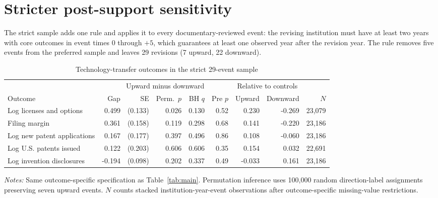 \section{Stricter post-support sensitivity}\label{app:strict}

The strict sample adds one rule and applies it to every documentary-reviewed event: the revising institution must have at least two years with core outcomes in event times 0 through $+5$, which guarantees at least one observed year after the revision year. The rule removes five events from the preferred sample and leaves 29 revisions (7 upward, 22 downward).

\begin{table}[htbp]\centering
\caption{Technology-transfer outcomes in the strict 29-event sample}\label{tab:strict}
\begin{threeparttable}\footnotesize\setlength{\tabcolsep}{4pt}
\begin{tabular}{lrrrrrrrr}\toprule
 & \multicolumn{5}{c}{Upward minus downward} & \multicolumn{2}{c}{Relative to controls} & \\\cmidrule(lr){2-6}\cmidrule(lr){7-8}
Outcome & Gap & SE & Perm.\ $p$ & BH $q$ & Pre $p$ & Upward & Downward & $N$ \\\midrule
Log licenses and options & 0.499 & (0.133) & 0.026 & 0.130 & 0.52 & 0.230 & -0.269 & 23,079 \\
Filing margin & 0.361 & (0.158) & 0.119 & 0.298 & 0.68 & 0.141 & -0.220 & 23,186 \\
Log new patent applications & 0.167 & (0.177) & 0.397 & 0.496 & 0.86 & 0.108 & -0.060 & 23,186 \\
Log U.S. patents issued & 0.122 & (0.203) & 0.606 & 0.606 & 0.35 & 0.154 & 0.032 & 22,691 \\
Log invention disclosures & -0.194 & (0.098) & 0.202 & 0.337 & 0.49 & -0.033 & 0.161 & 23,186 \\
\bottomrule
\end{tabular}
\begin{tablenotes}[flushleft]\footnotesize
\item \textit{Notes:} Same outcome-specific specification as Table~\ref{tab:main}. Permutation inference uses 100,000 random direction-label assignments preserving seven upward events. $N$ counts stacked institution-year-event observations after outcome-specific missing-value restrictions.
\end{tablenotes}
\end{threeparttable}
\end{table}
